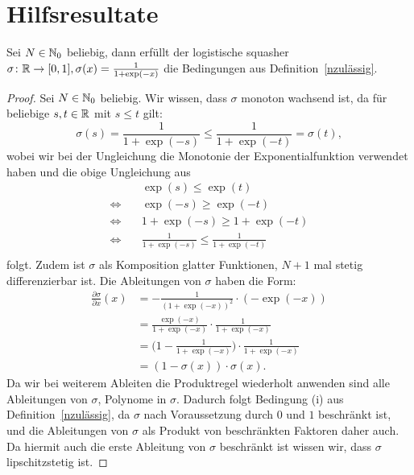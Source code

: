 \section{Hilfsresultate}
\begin{lem}
\label{lem:logsquasher}
Sei $N \in \mathbb{N}_0$ beliebig, dann erfüllt der logistische squasher $\sigma\colon \mathbb{R} \to [0, 1], \sigma(x) = \frac{1}{1 + \exp(-x)}$ die Bedingungen aus Definition~\ref{nzulässig}.  
\end{lem}
\begin{proof}
Sei $N \in \mathbb{N}_0$ beliebig. Wir wissen, dass $\sigma$ monoton wachsend ist, da für beliebige $s, t \in \mathbb{R}$ mit $s \leq t$ gilt:
$$\sigma(s) = \frac{1}{1 + \exp(-s)} \leq \frac{1}{1 + \exp(-t)} = \sigma(t),$$
wobei wir bei der Ungleichung die Monotonie der Exponentialfunktion verwendet haben und die obige Ungleichung aus
\begin{equation*}
\begin{split}
& \quad \exp(s) \leq \exp(t) \\
 \Leftrightarrow & \quad \exp(-s) \geq \exp(-t) \\
 \Leftrightarrow & \quad 1 + \exp(-s) \geq 1 + \exp(-t) \\
 \Leftrightarrow & \quad \frac{1}{1 + \exp(-s)} \leq \frac{1}{1 + \exp(-t)} \\
\end{split}
\end{equation*}
folgt. Zudem ist $\sigma$ als Komposition glatter Funktionen, $N + 1$ mal stetig differenzierbar ist. Die Ableitungen von $\sigma$ haben die Form:
\begin{equation*}
\begin{split}
\frac{\partial \sigma}{\partial x}(x) &= -\frac{1}{(1 + \exp(-x))^2} \cdot (-\exp(-x)) \\
& = \frac{\exp(-x)}{1 + \exp(-x)} \cdot \frac{1}{1 + \exp(-x)} \\
& = \bigg(1 - \frac{1}{1 + \exp(-x)}\bigg) \cdot \frac{1}{1 + \exp(-x)} \\
& = (1 - \sigma(x)) \cdot \sigma(x).
\end{split}
\end{equation*}
Da wir bei weiterem Ableiten die Produktregel wiederholt anwenden sind alle Ableitungen von $\sigma$, Polynome in $\sigma$. Dadurch folgt Bedingung (i) aus Definition~\ref{nzulässig}, da $\sigma$ nach Voraussetzung durch $0$ und $1$ beschränkt ist, und die Ableitungen von $\sigma$ als Produkt von beschränkten Faktoren daher auch. Da hiermit auch die erste Ableitung von $\sigma$ beschränkt ist wissen wir, dass $\sigma$ lipschitzstetig ist.


\end{proof}
